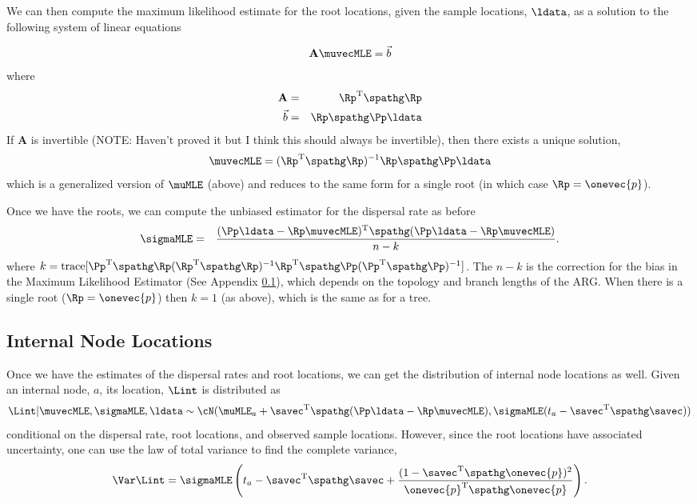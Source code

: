 We can then compute the maximum likelihood estimate for the root locations, given the sample locations, $\ldata$, as a solution to the following system of linear equations

\begin{eqnarray}
    \label{eq:location_of_roots}
    \mathbf{A} \muvecMLE = \vec{b} 
\end{eqnarray}
where 
\begin{eqnarray}
    \mathbf{A} &=& \Rp^\text{T}\spathg\Rp  \\
    \vec{b} &=& \Rp\spathg\Pp\ldata
\end{eqnarray}
If $\mathbf{A}$ is invertible (NOTE: Haven't proved it but I think this should always be invertible), then there exists a unique solution,
\begin{eqnarray}
 \muvecMLE = (\Rp^\text{T}\spathg\Rp)^{-1} \Rp\spathg\Pp\ldata   
\end{eqnarray}
which is a generalized version of $\muMLE$ (above) and reduces to the same form for a single root (in which case $\Rp = \onevec{p}$).

Once we have the roots, we can compute the unbiased estimator for the dispersal rate as before 
\begin{eqnarray}
    \sigmaMLE &=& \displaystyle \frac{ (\Pp\ldata - \Rp\muvecMLE)^\text{T} \spathg (\Pp\ldata - \Rp\muvecMLE) }{n-k}.
\end{eqnarray}
where $k = \text{trace}[  \Pp^\text{T}\spathg\Rp(\Rp^\text{T}\spathg\Rp)^{-1}\Rp^\text{T}\spathg\Pp(\Pp^\text{T}\spathg\Pp)^{-1} ]$. The $n-k$ is the correction for the bias in the Maximum Likelihood Estimator (See Appendix \ref{}), which depends on the topology and branch lengths of the ARG. When there is a single root ($\Rp = \onevec{p}$) then $k=1$ (as above), which is the same as for a tree.

\subsection{Internal Node Locations}
  

Once we have the estimates of the dispersal rates and root locations, we can get the distribution of internal node locations as well. Given an internal node, $a$, its location, $\Lint$ is distributed as
\begin{eqnarray}
    \Lint | \muvecMLE, \sigmaMLE, \ldata \sim \cN( \muMLE_a + \savec^\text{T}\spathg(\Pp\ldata - \Rp \muvecMLE), \sigmaMLE(t_a - \savec^\text{T}\spathg\savec))
\end{eqnarray}
conditional on the dispersal rate, root locations, and observed sample locations. However, since the root locations have associated uncertainty, one can use the law of total variance to find the complete variance,
\begin{eqnarray}
    \Var \Lint = \sigmaMLE\left(t_a - \savec^\text{T}\spathg\savec + \displaystyle \frac{(1 - \savec^\text{T}\spathg\onevec{p})^2}{\onevec{p}^\text{T}\spathg\onevec{p}}\right).
\end{eqnarray}

